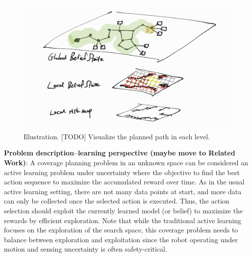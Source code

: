 \documentclass{article}
\newcommand{\ph}[1]{{\textbf{#1}:}} %
\begin{document}
\begin{figure}[t!]
  \centering
  \includegraphics[width=.6\textwidth]{IRM_Planning/figures/sketch_hierarchical_belief_space.png}
  \caption{Illustration. [TODO] Visualize the planned path in each level.}
  \label{fig:illustration}
\end{figure}


%
%


\ph{Problem description--learning perspective (maybe move to Related Work)}
A coverage planning problem in an unknown space can be considered an active learning problem under uncertainty where the objective to find the best action sequence to maximize the accumulated reward over time.
As in the usual active learning setting, there are not many data points at start, and more data can only be collected once the selected action is executed.
Thus, the action selection should exploit the currently learned model (or belief) to maximize the rewards by efficient exploration.
Note that while the traditional active learning focuses on the exploration of the search space, this coverage problem needs to balance between exploration and exploitation since the robot operating under motion and sensing uncertainty is often safety-critical. 
\end{document}
